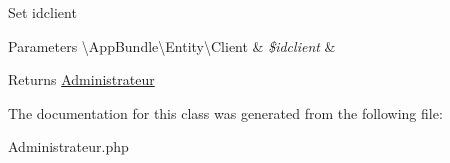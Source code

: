 Set idclient


\begin{DoxyParams}[1]{Parameters}
\textbackslash{}\+App\+Bundle\textbackslash{}\+Entity\textbackslash{}\+Client & {\em \$idclient} & \\
\hline
\end{DoxyParams}
\begin{DoxyReturn}{Returns}
\hyperlink{class_app_bundle_1_1_entity_1_1_administrateur}{Administrateur} 
\end{DoxyReturn}


The documentation for this class was generated from the following file\+:\begin{DoxyCompactItemize}
\item 
Administrateur.\+php\end{DoxyCompactItemize}
